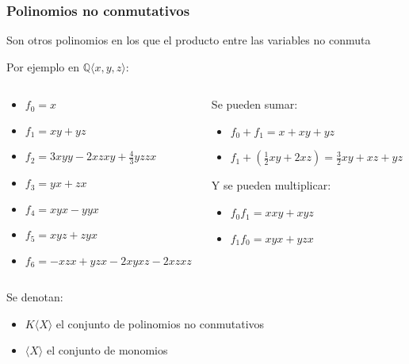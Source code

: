\documentclass[spanish, aspectratio=169, hidecontrols]{beamer}
\begin{document}
\begin{frame}
  \frametitle{Polinomios no conmutativos}
  Son otros polinomios en los que el producto entre las variables no conmuta
  \pause
  \begin{exampleblock}{Por ejemplo en $ℚ⟨x, y, z⟩$:}
    \begin{columns}
      \begin{column}{0.5\textwidth}
        \begin{itemize}
          \item $f_0 = x$
          \item $f_1 = xy + yz$
          \item $f_2 = 3 xyy - 2 xzxy + \frac{4}{3} yzzx$
          \item $f_3 = yx + zx$
          \item $f_4 = xyx - yyx$
          \item $f_5 = xyz + zyx$
          \item $f_6 = -xzx + yzx - 2xyxz - 2 xzxz$
        \end{itemize}
      \end{column}
      \begin{column}{0.5\textwidth}
        \pause
        Se pueden sumar:
        \begin{itemize}
          \item $f_0 + f_1 = x + xy + yz$
          \item $f_1 + (\frac{1}{2}xy + 2 xz) = \frac{3}{2} xy + xz + yz$
        \end{itemize}
        \pause
        Y se pueden multiplicar:
        \begin{itemize}
          \item $f_0 f_1 = xxy + xyz$
          \item $f_1 f_0 = xyx + yzx$
        \end{itemize}
      \end{column}
    \end{columns}
  \end{exampleblock}

  \pause

  Se denotan:
  \begin{itemize}
    \item \alert{$K⟨X⟩$} el conjunto de polinomios no conmutativos
    \item $⟨X⟩$ el conjunto de monomios
  \end{itemize}
\end{frame}
\end{document}
